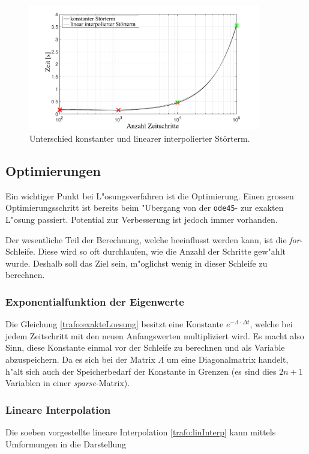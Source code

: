 \begin{refsection}
	
		\begin{figure}
			\centering
			\includegraphics[width=0.9\textwidth]{./Trafo/images/differenceTimestep.pdf}
			\caption{Unterschied konstanter und linearer interpolierter Störterm.}
		\end{figure}
\subsection{Optimierungen}

Ein wichtiger Punkt bei L"osungsverfahren ist die Optimierung. Einen grossen Optimierungsschritt ist bereits beim "Ubergang von der \texttt{ode45}- zur exakten L"osung passiert. Potential zur Verbesserung ist jedoch immer vorhanden.

Der wesentliche Teil der Berechnung, welche beeinflusst werden kann, ist die \textit{for}-Schleife. Diese wird so oft durchlaufen, wie die Anzahl der Schritte gew"ahlt wurde. Deshalb soll das Ziel sein, m"oglichst wenig in dieser Schleife zu berechnen. 

\subsubsection{Exponentialfunktion der Eigenwerte}
Die Gleichung \ref{trafo:exakteLoesung} besitzt eine Konstante $e^{-\Lambda \cdot \Delta t}$, welche bei jedem Zeitschritt mit den neuen Anfangswerten multipliziert wird. Es macht also Sinn, diese Konstante einmal vor der Schleife zu berechnen und als Variable abzuspeichern. Da es sich bei der Matrix $\Lambda$ um eine Diagonalmatrix handelt, h"alt sich auch der Speicherbedarf der Konstante in Grenzen (es sind dies $2n + 1$ Variablen in einer \textit{sparse}-Matrix). 

\subsubsection{Lineare Interpolation}
Die soeben vorgestellte lineare Interpolation \ref{trafo:linInterp} kann mittels Umformungen in die Darstellung 


\end{refsection}
